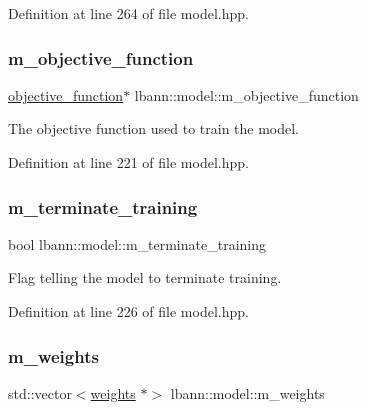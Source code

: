 Definition at line 264 of file model.\+hpp.

\mbox{\label{classlbann_1_1model_a24c50e7108dd7698671aed7df5b22e8b}} 
\subsubsection{\texorpdfstring{m\+\_\+objective\+\_\+function}{m\_objective\_function}}
{\footnotesize\ttfamily \hyperlink{classlbann_1_1objective__function}{objective\+\_\+function}$\ast$ lbann\+::model\+::m\+\_\+objective\+\_\+function\hspace{0.3cm}{\ttfamily [protected]}}

The objective function used to train the model. 

Definition at line 221 of file model.\+hpp.

\mbox{\label{classlbann_1_1model_a639f9c3fcb81b905085f8b1932f8920f}} 
\subsubsection{\texorpdfstring{m\+\_\+terminate\+\_\+training}{m\_terminate\_training}}
{\footnotesize\ttfamily bool lbann\+::model\+::m\+\_\+terminate\+\_\+training\hspace{0.3cm}{\ttfamily [protected]}}

Flag telling the model to terminate training. 

Definition at line 226 of file model.\+hpp.

\mbox{\label{classlbann_1_1model_aaf9adefe4497d90bf5bc2567e71bfb00}} 
\subsubsection{\texorpdfstring{m\+\_\+weights}{m\_weights}}
{\footnotesize\ttfamily std\+::vector$<$\hyperlink{classlbann_1_1weights}{weights} $\ast$$>$ lbann\+::model\+::m\+\_\+weights\hspace{0.3cm}{\ttfamily [protected]}}

